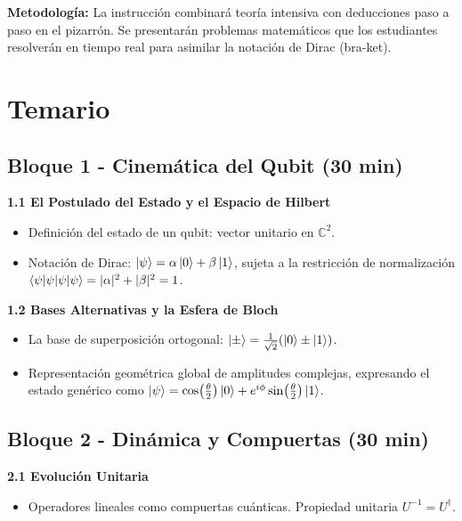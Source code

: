 \documentclass[12pt, a4paper]{article}
\begin{document}
\textbf{Metodología:}
La instrucción combinará teoría intensiva con deducciones paso a paso en el pizarrón. Se presentarán problemas matemáticos que los estudiantes resolverán en tiempo real para asimilar la notación de Dirac (bra-ket).

\newpage

\section*{Temario}

\subsection*{Bloque 1 - Cinemática del Qubit (30 min)}
\textbf{1.1 El Postulado del Estado y el Espacio de Hilbert}
\begin{itemize}
    \item Definición del estado de un qubit: vector unitario en $\mathbb{C}^2$.
    \item Notación de Dirac: $\ket{\psi} = \alpha\ket{0} + \beta\ket{1}$, sujeta a la restricción de normalización $\braket{\psi|\psi} = |\alpha|^2 + |\beta|^2 = 1$.
\end{itemize}

\textbf{1.2 Bases Alternativas y la Esfera de Bloch}
\begin{itemize}
    \item La base de superposición ortogonal: $\ket{\pm} = \frac{1}{\sqrt{2}}(\ket{0} \pm \ket{1})$.
    \item Representación geométrica global de amplitudes complejas, expresando el estado genérico como $\ket{\psi} = \cos(\frac{\theta}{2})\ket{0} + e^{i\phi}\sin(\frac{\theta}{2})\ket{1}$.
\end{itemize}

\subsection*{Bloque 2 - Dinámica y Compuertas (30 min)}
\textbf{2.1 Evolución Unitaria}
\begin{itemize}
    \item Operadores lineales como compuertas cuánticas. Propiedad unitaria $U^{-1} = U^\dagger$.
\end{itemize}
\end{document}

